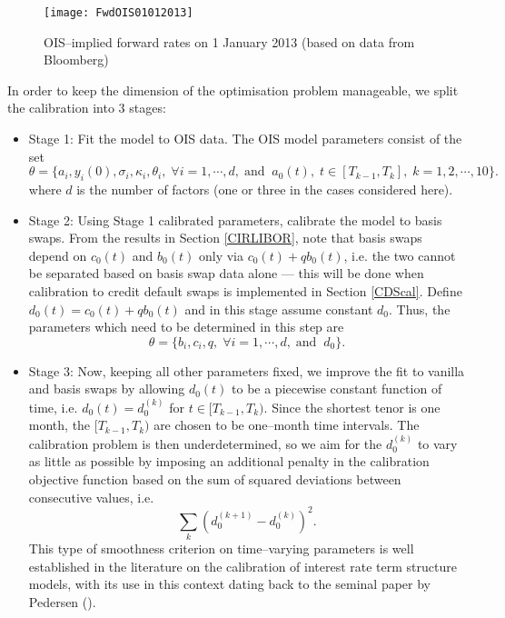 \documentclass[12pt,a4paper]{article}
\theoremstyle{plain}
\numberwithin{equation}{section}
\begin{document}
\begin{figure}[t]
\begin{center}
\texttt{[image: FwdOIS01012013]}
\end{center}
\caption{OIS--implied forward rates on 1 January 2013 (based on data from Bloomberg)}\label{OISfwd}
\end{figure}
In order to keep the dimension of the optimisation problem manageable, we split the calibration into 3 stages:
\begin{itemize}
\item Stage 1: Fit the model to OIS data. The OIS model parameters consist of the set
\[\theta=\{a_i,y_i(0),\sigma_i,\kappa_i,\theta_i,\;\forall i=1,\cdots,d, \;\mbox{and}\;\; a_0(t),\; t\in [T_{k-1},T_k],\; k=1,2,\cdots,10\}.\]
where $d$ is the number of factors (one or three in the cases considered here).
\item Stage 2: Using Stage 1 calibrated parameters, calibrate the model to basis swaps. From the results in Section \ref{CIRLIBOR}, note that basis swaps depend on $c_0(t)$ and $b_0(t)$ only via $c_0(t)+qb_0(t)$, i.e. the two cannot be separated based on basis swap data alone --- this will be done when calibration to credit default swaps is implemented in Section \ref{CDScal}. Define $d_0(t)=c_0(t)+qb_0(t)$ and in this stage assume constant $d_0$. Thus, the parameters which need to be determined in this step are
\[\theta=\{b_i,c_i,q, \;\forall i=1,\cdots,d, \;\mbox{and}\;\; d_0\}.\]
\item Stage 3: Now, keeping all other parameters fixed, we improve the fit to vanilla and basis swaps by allowing $d_0(t)$ to be a piecewise constant function of time, i.e. $d_0(t)=d_0^{(k)}$ for $t\in[T_{k-1},T_k).$ Since the shortest tenor is one month, the $[T_{k-1},T_k)$ are chosen to be one--month time intervals. The calibration problem is then underdetermined, so we aim for the $d_0^{(k)}$ to vary as little as possible by imposing an additional penalty in the calibration objective function based on the sum of squared deviations between consecutive values, i.e.
    $$
    \sum_k(d_0^{(k+1)}-d_0^{(k)})^2.
    $$
    This type of smoothness criterion on time--varying parameters is well established in the literature on the calibration of interest rate term structure models, with its use in this context dating back to the seminal paper by Pedersen (\citeyear*{OZ:Pedersen:98}).
\end{itemize}
\end{document}
